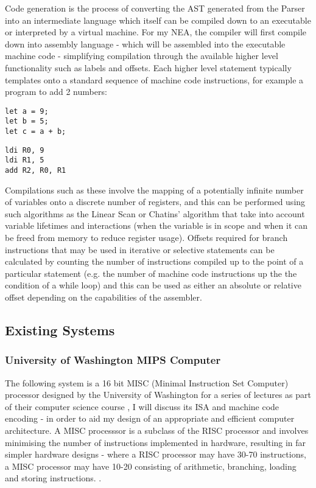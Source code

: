 Code generation is the process of converting the AST generated from the Parser into an intermediate language which itself can be compiled down to an executable or interpreted by a virtual machine. For my NEA, the compiler will first compile down into assembly language - which will be assembled into the executable machine code - simplifying compilation through the available higher level functionality such as labels and offsets. Each higher level statement typically templates onto a standard sequence of machine code instructions, for example a program to add 2 numbers:
\begin{lstlisting}
let a = 9;
let b = 5;
let c = a + b;
\end{lstlisting}
\begin{lstlisting}
ldi R0, 9
ldi R1, 5
add R2, R0, R1
\end{lstlisting}
Compilations such as these involve the mapping of a potentially infinite number of variables onto a discrete number of registers, and this can be performed using such algorithms as the Linear Scan or Chatins' algorithm \textcite{GFG-linearscan} that take into account variable lifetimes and interactions (when the variable is in scope and when it can be freed from memory to reduce register usage). Offsets required for branch instructions that may be used in iterative or selective statements can be calculated by counting the number of instructions compiled up to the point of a particular statement (e.g. the number of machine code instructions up the the condition of a while loop) and this can be used as either an absolute or relative offset depending on the capabilities of the assembler.

\subsection{Existing Systems}
\subsubsection{University of Washington MIPS Computer}
\label{sec:UoW}
The following system is a 16 bit MISC (Minimal Instruction Set Computer) processor designed by the University of Washington for a series of lectures as part of their computer science course \textcite{MIPS-uw}, I will discuss its ISA and machine code encoding - in order to aid my design of an appropriate and efficient computer architecture. A MISC processsor is a subclass of the RISC processor and involves minimising the number of instructions implemented in hardware, resulting in far simpler hardware designs - where a RISC processor may have 30-70 instructions, a MISC processor may have 10-20 consisting of arithmetic, branching, loading and storing instructions. \textcite{MISC-dakeng}. 

